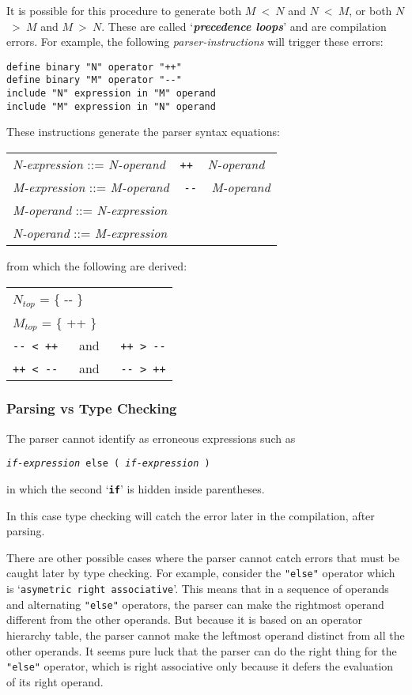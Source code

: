 \documentclass[12pt]{article}
\newcommand{\TT}[1]{{\tt \bfseries #1}}
\newcommand{\skey}[2]{{\bf \em #1#2}\index{#1}}
\newenvironment{indpar}[1][0.3in]%
	{\begin{list}{}%
		     {\setlength{\itemsep}{0in}%
		      \setlength{\topsep}{0in}%
		      \setlength{\parsep}{1ex}%
		      \setlength{\labelwidth}{#1}%
		      \setlength{\leftmargin}{#1}%
		      \addtolength{\leftmargin}{\labelsep}}%
	 \item}%
	{\end{list}}
\begin{document}
It is possible for this procedure to generate
both $M$~<~$N$ and $N$~<~$M$, or
both $N$~>~$M$ and $M$~>~$N$.
These are called `\skey{precedence loop}s' and are
compilation errors.  For example, the following
{\em parser-instructions} will trigger these errors:
\begin{indpar}\begin{verbatim}
define binary "N" operator "++"
define binary "M" operator "--"
include "N" expression in "M" operand
include "M" expression in "N" operand
\end{verbatim}\end{indpar}
These instructions generate the parser syntax equations:
\begin{center}
\begin{tabular}{l}
{\em N-expression} ::= {\em N-operand} ~ {\tt ++} ~ {\em N-operand} \\
{\em M-expression} ::= {\em M-operand} ~ {\tt -{}-} ~ {\em M-operand} \\
{\em M-operand} ::= {\em N-expression} \\
{\em N-operand} ::= {\em M-expression} \\
\end{tabular}
\end{center}
from which the following are derived:
\begin{center}
\begin{tabular}{l}
$N_{top}$ = \{ -{}- \} \\
$M_{top}$ = \{ +{}+ \} \\
{\tt -{}- < ++} ~~ and ~~ {\tt ++ > -{}-} \\
{\tt ++ < -{}-} ~~ and ~~ {\tt -{}- > ++} \\
\end{tabular}
\end{center}

\subsubsection{Parsing vs Type Checking}

The parser cannot identify as erroneous expressions such as
\begin{center}
\tt {\em if-expression} else ( {\em if-expression} )
\end{center}
in which the second `\TT{if}' is hidden inside parentheses.

In this case type checking will catch the error later in the
compilation, after parsing.

There are other possible cases where the parser cannot catch
errors that must be caught later by type checking.
For example, consider the {\tt "else"} operator
which is `{\tt asymetric right associative}'.  This means
that in a sequence of operands and alternating {\tt "else"}
operators, the parser can make the rightmost operand different
from the other operands.  But because it is based on an
operator hierarchy table, the parser cannot
make the leftmost operand distinct from all the other operands.
It seems pure luck that the parser can do the right thing
for the {\tt "else"} operator, which is right associative only
because it defers the evaluation of its right operand.
\end{document}

